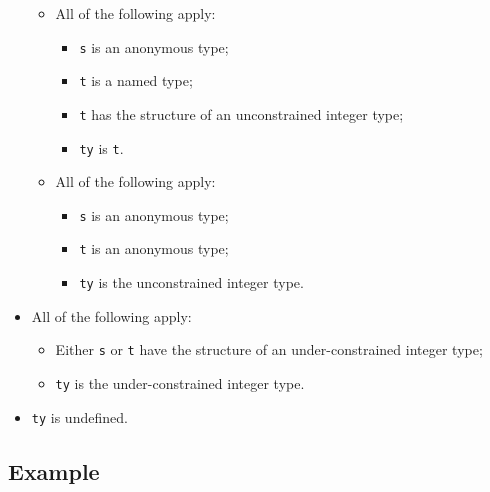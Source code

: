 \documentclass{book}
\begin{document}
\begin{itemize}
\begin{itemize}
      \item All of the following apply:
        \begin{itemize}
        \item \texttt{s} is an anonymous type;
        \item \texttt{t} is a named type;
        \item \texttt{t} has the structure of an unconstrained integer type;
        \item \texttt{ty} is \texttt{t}.
        \end{itemize}

      \item All of the following apply:
        \begin{itemize}
        \item \texttt{s} is an anonymous type;
        \item \texttt{t} is an anonymous type;
	\item \texttt{ty} is the unconstrained integer type.
        \end{itemize}
    \end{itemize}

  \item All of the following apply:
    \begin{itemize}
    \item Either \texttt{s} or \texttt{t} have the structure of an under-constrained integer type;
    \item \texttt{ty} is the under-constrained integer type.
    \end{itemize}

  \item \texttt{ty} is undefined.
  \end{itemize}

  \subsection{Example}


\end{document}
